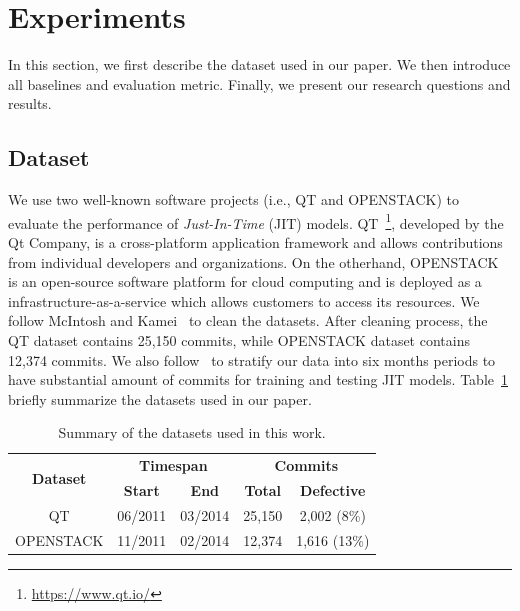 \section{Experiments}
\label{sec:exp}
In this section, we first describe the dataset used in our paper. We then introduce all baselines and evaluation metric. Finally, we present our research questions and results.

\subsection{Dataset}
\label{sec:dataset}
We use two well-known software projects (i.e., QT and OPENSTACK) to evaluate the performance of \emph{Just-In-Time} (JIT) models. QT~\footnote{\url{https://www.qt.io/}}, developed by the Qt Company, is a cross-platform application framework and allows contributions from individual developers and organizations. On the otherhand, OPENSTACK is an open-source software platform for cloud computing and is deployed as a infrastructure-as-a-service which allows customers to access its resources. We follow McIntosh and Kamei~\cite{mcintosh2018fix} to clean the datasets. After cleaning process, the QT dataset contains 25,150 commits, while OPENSTACK dataset contains 12,374 commits. We also follow~\cite{mcintosh2018fix} to stratify our data into six months periods to have substantial amount of commits for training and testing JIT models. Table~\ref{tab:data} briefly summarize the datasets used in our paper. 

\begin{table}[t!]
  \centering
  \caption{Summary of the datasets used in this work.}
    \begin{tabular}{|c|c|c|c|c|}
    \hline
    \multirow{2}[4]{*}{\textbf{Dataset}} & \multicolumn{2}{c|}{\textbf{Timespan}} & \multicolumn{2}{c|}{\textbf{Commits}} \\
\cline{2-5}          & \textbf{Start} & \textbf{End} & \textbf{Total} & \textbf{Defective} \\
    \hline
    \hline
    QT    & 06/2011 &  03/2014 & 25,150 & 2,002 (8\%) \\
    \hline
    OPENSTACK & 11/2011 &  02/2014 & 12,374 & 1,616 (13\%) \\
    \hline
    \end{tabular}%
  \label{tab:data}%
\end{table}%

